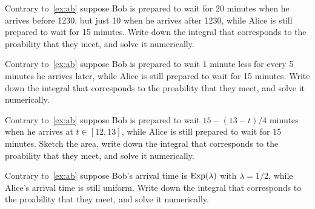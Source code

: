 \documentclass[../../assignments/assignments]{subfiles}
\begin{document}
\begin{exercise}
Contrary to~\cref{ex:ab} suppose Bob is prepared to wait for 20 minutes when he arrives before 1230, but just 10 when he arrives after 1230, while Alice is still prepared to wait for 15 minutes. Write down the integral that corresponds to the proability that they meet, and solve it numerically.
\begin{hint}
\end{hint}
\begin{solution}
\end{solution}
\end{exercise}


\begin{exercise}
Contrary to~\cref{ex:ab} suppose Bob is prepared to wait 1 minute less for every 5 minutes he arrives later, while Alice is still prepared to wait for 15 minutes. Write down the integral that corresponds to the proability that they meet, and solve it numerically.
\begin{hint}
\end{hint}
\begin{solution}
\end{solution}
\end{exercise}



\begin{exercise}
Contrary to~\cref{ex:ab} suppose Bob is prepared to wait $15 - (13-t)/4$ minutes when he arrives at $t\in [12, 13]$, while Alice is still prepared to wait for 15 minutes. Sketch the area, write down the integral that corresponds to the proability that they meet, and solve it numerically.
\begin{hint}
\end{hint}
\begin{solution}
\end{solution}
\end{exercise}

\begin{exercise}
Contrary to~\cref{ex:ab} suppose Bob's arrival time is $\mathrm{Exp}(\lambda)$ with $\lambda=1/2$,  while Alice's arrival time is still uniform.
Write down the integral that corresponds to the proability that they meet, and solve it numerically.
\begin{hint}
\end{hint}
\begin{solution}
\end{solution}
\end{exercise}
\end{document}
